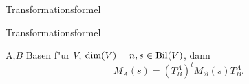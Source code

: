 \documentclass[class=article, crop=false]{standalone}
\begin{document}
\begin{zettel}{Transformationsformel}
\begin{flashcard}{Transformationsformel}
	\begin{theorem}[Transformationsformel]
		A,$B$ Basen f"ur $V$, $\dim(V)= n , s \in  \operatorname{Bil} (V)$, dann
		\[
			M_A(s) = (T_B^A)^t M_{\mathcal B}(s) T_B^A
		.\]
	\end{theorem}
\end{flashcard}

\end{zettel}
\end{document}
